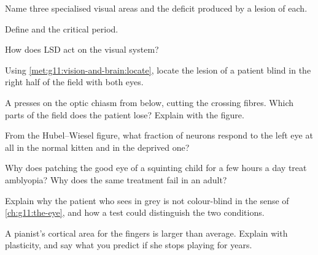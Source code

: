 \begin{exercise}[$\star$]\label{exo:g11:vision-and-brain:3}
Name three specialised visual areas and the deficit produced by a
lesion of each.
\end{exercise}

\begin{exercise}[$\star$]\label{exo:g11:vision-and-brain:4}
Define  and the critical period.
\end{exercise}

\begin{exercise}[$\star$]\label{exo:g11:vision-and-brain:5}
How does LSD act on the visual system?
\end{exercise}

\begin{exercise}[$\star\star$]\label{exo:g11:vision-and-brain:6}
Using \cref{met:g11:vision-and-brain:locate}, locate the lesion of a
patient blind in the right half of the field with both eyes.
\end{exercise}

\begin{exercise}[$\star\star$]\label{exo:g11:vision-and-brain:7}
A  presses on the optic chiasm from below, cutting the crossing
fibres. Which parts of the field does the patient lose? Explain with
the figure.
\end{exercise}

\begin{exercise}[$\star\star$]\label{exo:g11:vision-and-brain:8}
From the Hubel--Wiesel figure, what fraction of neurons respond to the
left eye at all in the normal kitten and in the deprived one?
\end{exercise}

\begin{exercise}[$\star\star$]\label{exo:g11:vision-and-brain:9}
Why does patching the good eye of a squinting child for a few hours a
day treat amblyopia? Why does the same treatment fail in an adult?
\end{exercise}

\begin{exercise}[$\star\star$]\label{exo:g11:vision-and-brain:10}
Explain why the patient who sees in grey is not colour-blind in the
sense of \cref{ch:g11:the-eye}, and how a test could distinguish the
two conditions.
\end{exercise}

\begin{exercise}[$\star\star$]\label{exo:g11:vision-and-brain:11}
A pianist's cortical area for the fingers is larger than average.
Explain with plasticity, and say what you predict if she stops playing
for years.
\end{exercise}

